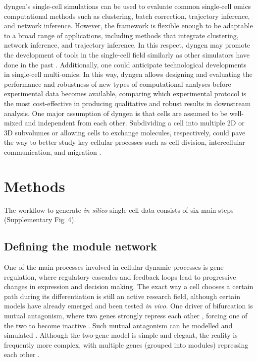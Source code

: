 \documentclass[10pt, a4paper]{article}
\begin{document}
dyngen's single-cell simulations can be used to evaluate common
single-cell omics computational methods such as clustering, batch
correction, trajectory inference, and network inference. However, the
framework is flexible enough to be adaptable to a broad range of
applications, including methods that integrate clustering, network
inference, and trajectory inference. In this respect, dyngen may promote
the development of tools in the single-cell field similarly as other
simulators have done in the past
\cite{schaffter_genenetweaversilicobenchmark_2011,ewing_combiningtumorgenome_2015}.
Additionally, one could anticipate technological developments in
single-cell multi-omics. In this way, dyngen allows designing and
evaluating the performance and robustness of new types of computational
analyses before experimental data becomes available, comparing which
experimental protocol is the most cost-effective in producing
qualitative and robust results in downstream analysis. One major
assumption of dyngen is that cells are assumed to be well-mixed and
independent from each other. Subdividing a cell into multiple 2D or 3D
subvolumes or allowing cells to exchange molecules, respectively, could
pave the way to better study key cellular processes such as cell
division, intercellular communication, and migration
\cite{smith_spatialstochasticintracellular_2019}.

\newpage

\hypertarget{sec:dyngen-methods}{%
	\section{Methods}\label{sec:dyngen-methods}}

The workflow to generate \emph{in silico} single-cell data consists of
six main steps (Supplementary Fig~4).

\hypertarget{sec:dyngen-modules}{%
	\subsection{Defining the module network}\label{sec:dyngen-modules}}

One of the main processes involved in cellular dynamic processes is gene
regulation, where regulatory cascades and feedback loops lead to
progressive changes in expression and decision making. The exact way a
cell chooses a certain path during its differentiation is still an
active research field, although certain models have already emerged and
been tested \emph{in vivo}. One driver of bifurcation is mutual
antagonism, where two genes strongly repress each other
\cite{rekhtman_directinteractionhematopoietic_1999,xu_regulationbifurcatingcell_2015},
forcing one of the two to become inactive
\cite{graf_forcingcellschange_2009}. Such mutual antagonism can be
modelled and simulated
\cite{wang_quantifyingwaddingtonlandscape_2011,ferrell_bistabilitybifurcationswaddington_2012}.
Although the two-gene model is simple and elegant, the reality is
frequently more complex, with multiple genes (grouped into modules)
repressing each other \cite{yosef_dynamicregulatorynetwork_2013}.
\end{document}

